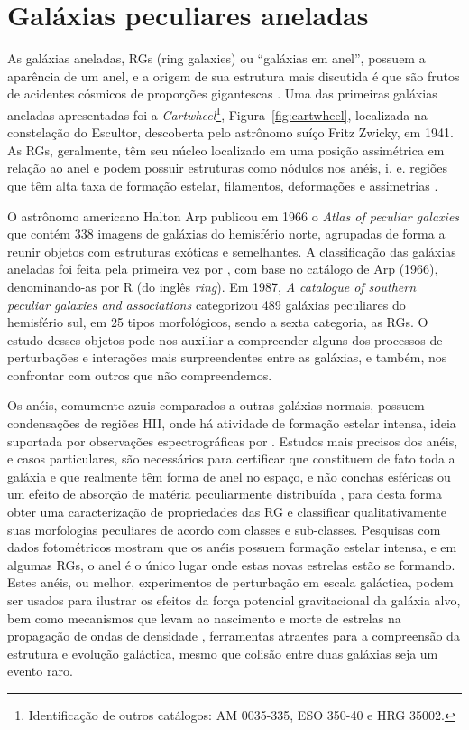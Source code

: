 \chapter{Galáxias peculiares aneladas}

As galáxias aneladas, RGs (ring galaxies) ou ``galáxias em anel'', possuem a aparência de um anel, e a origem de sua estrutura mais discutida é que são frutos de acidentes cósmicos de proporções gigantescas \cite{Appleton96}. Uma das primeiras galáxias aneladas apresentadas foi a \emph{Cartwheel}\footnote{Identificação de outros catálogos: AM 0035-335, ESO 350-40 e HRG 35002.}, Figura~\ref{fig:cartwheel}, localizada na constelação do Escultor, descoberta pelo astrônomo suíço Fritz Zwicky, em 1941. As RGs, geralmente, têm seu núcleo localizado em uma posição assimétrica em relação ao anel e podem possuir estruturas como nódulos nos anéis, i. e. regiões que têm alta taxa de formação estelar, filamentos, deformações e assimetrias \cite{2016lago}. 

O astrônomo americano Halton Arp publicou em 1966 o \emph{Atlas of peculiar galaxies} \cite{1966Arp} que contém 338 imagens de galáxias do hemisfério norte, agrupadas de forma a reunir objetos com estruturas exóticas e semelhantes. A classificação das galáxias aneladas foi feita pela primeira vez por , com base no catálogo de Arp (1966), denominando-as por R (do inglês \emph{ring}). Em 1987, \emph{A catalogue of southern peculiar galaxies and associations} \cite{1987arpmadore} categorizou 489 galáxias peculiares do hemisfério sul, em 25 tipos morfológicos, sendo a sexta categoria, as RGs. O estudo desses objetos pode nos auxiliar a compreender alguns dos processos de perturbações e interações mais surpreendentes entre as galáxias, e também, nos confrontar com outros que não compreendemos.

Os anéis, comumente azuis comparados a outras galáxias normais, possuem condensações de regiões HII, onde há atividade de formação estelar intensa, ideia suportada por observações espectrográficas por . Estudos mais precisos dos anéis, e casos particulares, são necessários para certificar que constituem de fato toda a galáxia e que realmente têm forma de anel no espaço, e não conchas esféricas ou um efeito de absorção de matéria peculiarmente distribuída \cite{Agosto1970}, para desta forma obter uma caracterização de propriedades das RG e classificar qualitativamente suas morfologias peculiares de acordo com classes e sub-classes. Pesquisas com dados fotométricos mostram que os anéis possuem formação estelar intensa, e em algumas RGs, o anel é o único lugar onde estas novas estrelas estão se formando. Estes anéis, ou melhor, experimentos de perturbação em escala galáctica, podem ser usados para ilustrar os efeitos da força potencial gravitacional da galáxia alvo, bem como mecanismos que levam ao nascimento e morte de estrelas na propagação de ondas de densidade \cite{Appleton96}, ferramentas atraentes para a compreensão da estrutura e evolução galáctica, mesmo que colisão entre duas galáxias seja um evento raro.

